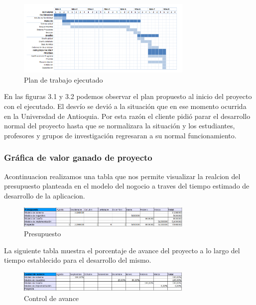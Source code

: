 \documentclass[12pt,oneside,letterpaper]{report}
\begin{document}
\begin{figure}[h!]
  \centering
      \includegraphics[width=0.75\textwidth]{./img/cal2.png}
  \caption{Plan de trabajo ejecutado}
\end{figure}

\maketitle En las figuras 3.1 y 3.2 podemos observar el plan propuesto al inicio del proyecto con el ejecutado. El desvío se devió a la situación que en ese momento ocurrida en la Universdad de Antioquia. Por esta razón el cliente pidió parar el desarrollo normal del proyecto hasta que se normalizara la situación y los estudiantes, profesores y grupos de investigación regresaran a su normal funcionamiento.

\subsubsection{Gráfica de valor ganado de proyecto}

Acontinuacion realizamos una tabla que nos permite visualizar la realcion del presupuesto planteada en
el modelo del nogocio a traves del tiempo estimado de desarrollo de la aplicacion.

\begin{figure}[h!]
  \centering
      \includegraphics[width=0.75\textwidth]{./img/imagen1.png}
  \caption{Presupuesto}
\end{figure}

La siguiente tabla muestra el porcentaje de avance del proyecto a lo largo del tiempo establecido para el desarrollo del mismo.

\begin{figure}[h!]
  \centering
      \includegraphics[width=0.75\textwidth]{./img/imagen2.png}
  \caption{Control de avance}
\end{figure}
\end{document}
